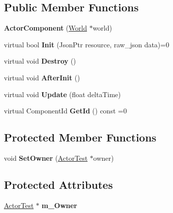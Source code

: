 \subsection*{Public Member Functions}
\begin{DoxyCompactItemize}
\item 
\mbox{\label{classTarbora_1_1ActorComponent_a83bb4f1b2b6af8523ae2541e02af0fb2}} 
{\bfseries Actor\+Component} (\hyperlink{classTarbora_1_1World}{World} $\ast$world)
\item 
\mbox{\label{classTarbora_1_1ActorComponent_a55d053ca98c31bd3f79f005888b7e428}} 
virtual bool {\bfseries Init} (Json\+Ptr resource, raw\+\_\+json data)=0
\item 
\mbox{\label{classTarbora_1_1ActorComponent_a940239e984904afe67fc63a70e1be1ec}} 
virtual void {\bfseries Destroy} ()
\item 
\mbox{\label{classTarbora_1_1ActorComponent_ad9139206456b2f466509c35111706b7e}} 
virtual void {\bfseries After\+Init} ()
\item 
\mbox{\label{classTarbora_1_1ActorComponent_a1819cca7b2392047d95614b2c71cb56e}} 
virtual void {\bfseries Update} (float delta\+Time)
\item 
\mbox{\label{classTarbora_1_1ActorComponent_a395c55c7c250466e3c037fa4090da5d5}} 
virtual Component\+Id {\bfseries Get\+Id} () const =0
\end{DoxyCompactItemize}
\subsection*{Protected Member Functions}
\begin{DoxyCompactItemize}
\item 
\mbox{\label{classTarbora_1_1ActorComponent_abf8b7b050e3777624e42336cc661b106}} 
void {\bfseries Set\+Owner} (\hyperlink{classTarbora_1_1ActorTest}{Actor\+Test} $\ast$owner)
\end{DoxyCompactItemize}
\subsection*{Protected Attributes}
\begin{DoxyCompactItemize}
\item 
\mbox{\label{classTarbora_1_1ActorComponent_aa1f0c0a35625fe1a16dcb1f0ee67d7e9}} 
\hyperlink{classTarbora_1_1ActorTest}{Actor\+Test} $\ast$ {\bfseries m\+\_\+\+Owner}
\end{DoxyCompactItemize}
